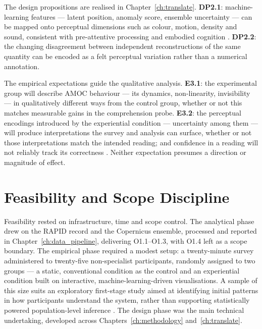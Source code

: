 The design propositions are realised in Chapter~\ref{ch:translate}. \textbf{DP2.1}: machine-learning features --- latent position, anomaly score, ensemble uncertainty --- can be mapped onto perceptual dimensions such as colour, motion, density and sound, consistent with pre-attentive processing and embodied cognition \citep{lakoff1999, ware2021}. \textbf{DP2.2}: the changing disagreement between independent reconstructions of the same quantity can be encoded as a felt perceptual variation rather than a numerical annotation.

The empirical expectations guide the qualitative analysis. \textbf{E3.1}: the experimental group will describe AMOC behaviour --- its dynamics, non-linearity, invisibility --- in qualitatively different ways from the control group, whether or not this matches measurable gains in the comprehension probe. \textbf{E3.2}: the perceptual encodings introduced by the experiential condition --- uncertainty among them --- will produce interpretations the survey and analysis can surface, whether or not those interpretations match the intended reading; and confidence in a reading will not reliably track its correctness \citep{fischer2020}. Neither expectation presumes a direction or magnitude of effect.



\section{Feasibility and Scope Discipline}
\label{sec:rq-feasibility}

Feasibility rested on infrastructure, time and scope control. The analytical phase drew on the RAPID record and the Copernicus ensemble, processed and reported in Chapter~\ref{ch:data_pipeline}, delivering O1.1--O1.3, with O1.4 left as a scope boundary. The empirical phase required a modest setup: a twenty-minute survey administered to twenty-five non-specialist participants, randomly assigned to two groups --- a static, conventional condition as the control and an experiential condition built on interactive, machine-learning-driven visualisations. A sample of this size suits an exploratory first-stage study aimed at identifying initial patterns in how participants understand the system, rather than supporting statistically powered population-level inference \citep{braunclarke2006, smithmcgannon2018, malterud2016}. The design phase was the main technical undertaking, developed across Chapters~\ref{ch:methodology} and~\ref{ch:translate}.

